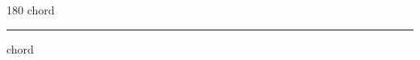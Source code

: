 
\begin{frame}
\begin{center}
\begin{turn}{180}
{\fontsize{2.5cm}{1em}\selectfont chord}
\end{turn}
\vspace{1em}\par  
\hrule
\vspace{1em}\par  
{\fontsize{2.5cm}{1em}\selectfont chord}
\end{center}
\end{frame}
